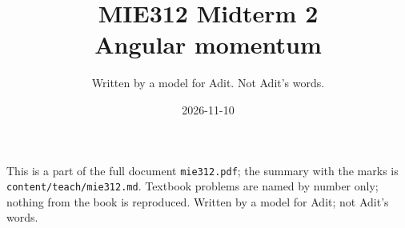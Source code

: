
\title{MIE312 Midterm 2\\[0.3em]\large Angular momentum}
\author{Written by a model for Adit. Not Adit's words.}
\date{2026-11-10}

\maketitle
\begin{sloppypar}\noindent\small This is a part of the full document \texttt{mie312.pdf}; the summary with the marks is \texttt{content/teach/mie312.md}. Textbook problems are named by number only; nothing from the book is reproduced. Written by a model for Adit; not Adit's words.\normalsize\end{sloppypar}



